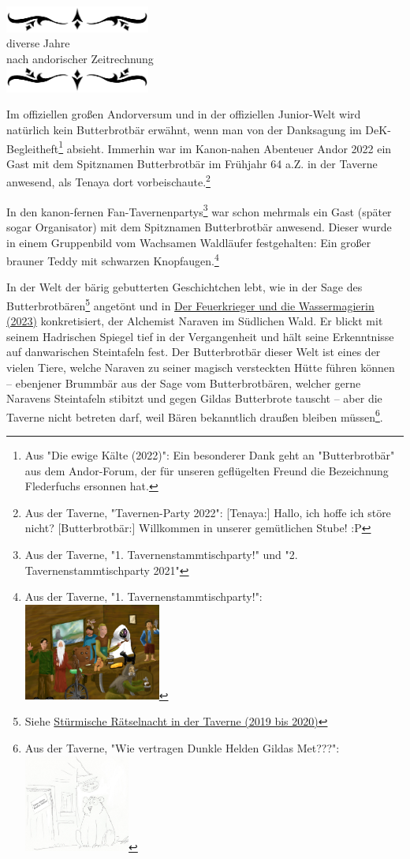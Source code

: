 \documentclass[10pt, a4paper, oneside]{book}
\newcommand{\hypref}[1]{%
    \hyperref[#1]{#1}%
}
\newcommand{\az}[1]{%
    \begin{center}
        \includegraphics[width=180px]{Das Erbe des Wunderkindes/verzierung1.png}\\
        {\Huge #1} \\
        {nach andorischer Zeitrechnung}\\
        \includegraphics[width=180px]{Das Erbe des Wunderkindes/verzierung2.png}
    \end{center}
    \extramarks{}{#1 a.Z.}
}
\begin{document}
\az{diverse Jahre}

{\parindent0pt

Im offiziellen großen Andorversum und in der offiziellen Junior-Welt wird natürlich kein Butterbrotbär erwähnt, wenn man von der Danksagung im DeK-Begleitheft\footnote{Aus "Die ewige Kälte (2022)": Ein besonderer Dank geht an "Butterbrotbär" aus dem Andor-Forum, der für unseren geflügelten Freund die Bezeichnung Flederfuchs ersonnen hat.} absieht. Immerhin war im Kanon-nahen Abenteuer Andor 2022 ein Gast mit dem Spitznamen Butterbrotbär im Frühjahr 64 a.Z. in der Taverne anwesend, als Tenaya dort vorbeischaute.\footnote{Aus der Taverne, "Tavernen-Party 2022": [Tenaya:] Hallo, ich hoffe ich störe nicht? [Butterbrotbär:] Willkommen in unserer gemütlichen Stube! :P}\newpage


In den kanon-fernen Fan-Tavernenpartys\footnote{Aus der Taverne, "1. Tavernenstammtischparty!" und "2. Tavernenstammtischparty 2021"} war schon mehrmals ein Gast (später sogar Organisator) mit dem Spitznamen Butterbrotbär anwesend. Dieser wurde in einem Gruppenbild vom Wachsamen Waldläufer festgehalten: Ein großer brauner Teddy mit schwarzen Knopfaugen.\footnote{Aus der Taverne, "1. Tavernenstammtischparty!":\\\includegraphics[height=120px]{Das Erbe des Wunderkindes/Bilder/Tavernenstammtischparty 2020 Gruppenbild.jpg}}\bigskip


In der Welt der bärig gebutterten Geschichtchen lebt, wie in der Sage des Butterbrotbären\footnote{Siehe \hypref{Stürmische Rätselnacht in der Taverne (2019 bis 2020)}} angetönt und in \hypref{Der Feuerkrieger und die Wassermagierin (2023)} konkretisiert, der Alchemist Naraven im Südlichen Wald. Er blickt mit seinem Hadrischen Spiegel tief in der Vergangenheit und hält seine Erkenntnisse auf danwarischen Steintafeln fest. Der Butterbrotbär dieser Welt ist eines der vielen Tiere, welche Naraven zu seiner magisch versteckten Hütte führen können – ebenjener Brummbär aus der Sage vom Butterbrotbären, welcher gerne Naravens Steintafeln stibitzt und gegen Gildas Butterbrote tauscht – aber die Taverne nicht betreten darf, weil Bären bekanntlich draußen bleiben müssen\footnote{ Aus der Taverne, "Wie vertragen Dunkle Helden Gildas Met???":\\\includegraphics[height=120px]{Das Erbe des Wunderkindes/Bilder/Bären müssen draußen bleiben.jpg}}.\bigskip



}
\end{document}

